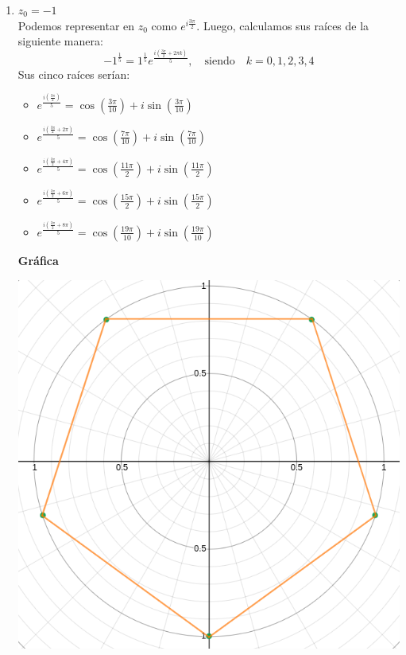 \documentclass[a4paper,12pt]{article}
\begin{document}
\begin{enumerate}
        \begin{enumerate}
            \item $z_{0}=-1$\\
            Podemos representar en $z_0$ como $e^{i\frac{3\pi}{2}}$. Luego, calculamos sus raíces de la siguiente manera: 
            $$-1^{\frac{1}{5}} = 1^{\frac{1}{5}} e^{\frac{i\left(\frac{3\pi}{2}+2\pi  k\right)}{5}}, \quad \textrm{siendo}\quad k=0, 1,2,3,4$$ 
            Sus cinco raíces serían:\\
            \begin{itemize}
                \item $ e^{\frac{i\left(\frac{3\pi}{2}\right)}{5}} = \cos \left( \frac{3\pi}{10}\right) +i \sin \left( \frac{3\pi}{10}\right)$
                \item $ e^{\frac{i\left(\frac{3\pi}{2}+2\pi\right)}{5}} = \cos \left( \frac{7\pi}{10}\right) +i \sin \left( \frac{7\pi}{10}\right)$
                \item $ e^{\frac{i\left(\frac{3\pi}{2}+4\pi\right)}{5}} = \cos \left( \frac{11\pi}{2}\right) +i \sin \left( \frac{11\pi}{2}\right)$
                \item $ e^{\frac{i\left(\frac{3\pi}{2}+6\pi\right)}{5}} = \cos \left( \frac{15\pi}{2}\right) +i \sin \left( \frac{15\pi}{2}\right)$
                \item $ e^{\frac{i\left(\frac{3\pi}{2}+8\pi\right)}{5}} = \cos \left( \frac{19\pi}{10}\right) +i \sin \left( \frac{19\pi}{10}\right)$
            \end{itemize}
            \textbf{Gráfica}
            \begin{center}
            \includegraphics[scale=0.4]{16-a.png}  
            \end{center}
             

\end{enumerate}
\end{enumerate}
\end{document}
